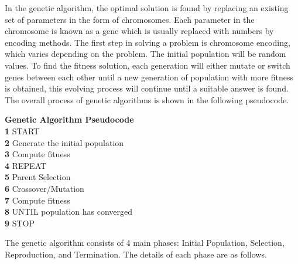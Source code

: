 \documentclass[12pt,oneside,openright,a4paper]{cpe-english-project}
\begin{document}
In the genetic algorithm, the optimal solution is found by replacing an existing set of parameters in the form of chromosomes. Each parameter in the chromosome is known as a gene which is usually replaced with numbers by encoding methods.  The first step in solving a problem is chromosome encoding, which varies depending on the problem. The initial population will be random values. To find the fitness solution, each generation will either mutate or switch genes between each other until a new generation of population with more fitness is obtained, this evolving process will continue until a suitable answer is found. The overall process of genetic algorithms is shown in the following pseudocode.

\textbf{Genetic Algorithm Pseudocode}\cite{IntroductiontoGeneticAlgorithmsIncludingExampleCode}\\
\indent\textbf{1} START\\
\indent\textbf{2} Generate the initial population\\
\indent\textbf{3} Compute fitness\\
\indent\textbf{4} REPEAT\\
\indent\textbf{5} \quad Parent Selection\\
\indent\textbf{6} \quad Crossover/Mutation\\
\indent\textbf{7} \quad Compute fitness\\
\indent\textbf{8} UNTIL population has converged\\
\indent\textbf{9} STOP\

The genetic algorithm consists of 4 main phases: Initial Population, Selection, Reproduction, and Termination. The details of each phase are as follows.
\end{document}
